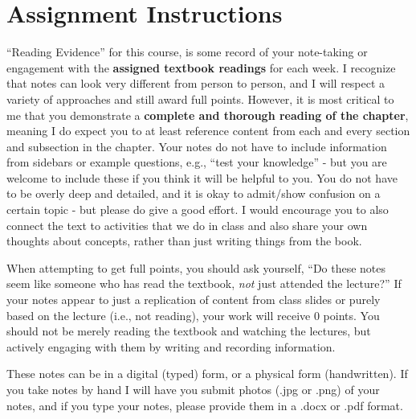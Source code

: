 \documentclass[
  12pt,
  letterpaper,
]{scrartcl}
\renewcommand*\contentsname{Table of contents}
\newcommand\contentsname{Table of contents}
\begin{document}


\pagestyle{scrheadings}

\frenchspacing %

\renewcommand*\contentsname{Table of Contents}
{
\hypersetup{linkcolor=}
\setcounter{tocdepth}{2}
\tableofcontents
}

\newpage{}

\section{Assignment Instructions}\label{assignment-instructions}

``Reading Evidence'' for this course, is some record of your note-taking
or engagement with the \textbf{assigned textbook readings} for each
week. I recognize that notes can look very different from person to
person, and I will respect a variety of approaches and still award full
points. However, it is most critical to me that you demonstrate a
\textbf{complete and thorough reading of the chapter}, meaning I do
expect you to at least reference content from each and every section and
subsection in the chapter. Your notes do not have to include information
from sidebars or example questions, e.g., ``test your knowledge'' - but
you are welcome to include these if you think it will be helpful to you.
You do not have to be overly deep and detailed, and it is okay to
admit/show confusion on a certain topic - but please do give a good
effort. I would encourage you to also connect the text to activities
that we do in class and also share your own thoughts about concepts,
rather than just writing things from the book.

When attempting to get full points, you should ask yourself, ``Do these
notes seem like someone who has read the textbook, \emph{not} just
attended the lecture?'' If your notes appear to just a replication of
content from class slides or purely based on the lecture (i.e., not
reading), your work will receive 0 points. You should not be merely
reading the textbook and watching the lectures, but actively engaging
with them by writing and recording information.

These notes can be in a digital (typed) form, or a physical form
(handwritten). If you take notes by hand I will have you submit photos
(.jpg or .png) of your notes, and if you type your notes, please provide
them in a .docx or .pdf format.
\end{document}
